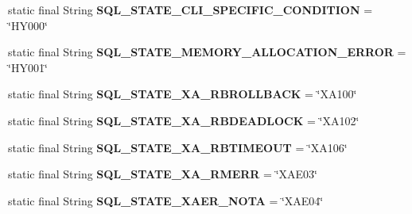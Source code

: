 \begin{DoxyCompactItemize}
static final String {\bfseries S\+Q\+L\+\_\+\+S\+T\+A\+T\+E\+\_\+\+C\+L\+I\+\_\+\+S\+P\+E\+C\+I\+F\+I\+C\+\_\+\+C\+O\+N\+D\+I\+T\+I\+ON} = \char`\"{}H\+Y000\char`\"{}
\item 
\mbox{\label{classcom_1_1mysql_1_1cj_1_1exceptions_1_1_mysql_error_numbers_a52bede019332d9e09454a9dc7efb2cf5}} 
static final String {\bfseries S\+Q\+L\+\_\+\+S\+T\+A\+T\+E\+\_\+\+M\+E\+M\+O\+R\+Y\+\_\+\+A\+L\+L\+O\+C\+A\+T\+I\+O\+N\+\_\+\+E\+R\+R\+OR} = \char`\"{}H\+Y001\char`\"{}
\item 
\mbox{\label{classcom_1_1mysql_1_1cj_1_1exceptions_1_1_mysql_error_numbers_a7d73cd99f43ef4739127fc2e99365050}} 
static final String {\bfseries S\+Q\+L\+\_\+\+S\+T\+A\+T\+E\+\_\+\+X\+A\+\_\+\+R\+B\+R\+O\+L\+L\+B\+A\+CK} = \char`\"{}X\+A100\char`\"{}
\item 
\mbox{\label{classcom_1_1mysql_1_1cj_1_1exceptions_1_1_mysql_error_numbers_a630346638b3d4374927cbeb24486b162}} 
static final String {\bfseries S\+Q\+L\+\_\+\+S\+T\+A\+T\+E\+\_\+\+X\+A\+\_\+\+R\+B\+D\+E\+A\+D\+L\+O\+CK} = \char`\"{}X\+A102\char`\"{}
\item 
\mbox{\label{classcom_1_1mysql_1_1cj_1_1exceptions_1_1_mysql_error_numbers_a2d32becd1fca43707034fa38cffae2e8}} 
static final String {\bfseries S\+Q\+L\+\_\+\+S\+T\+A\+T\+E\+\_\+\+X\+A\+\_\+\+R\+B\+T\+I\+M\+E\+O\+UT} = \char`\"{}X\+A106\char`\"{}
\item 
\mbox{\label{classcom_1_1mysql_1_1cj_1_1exceptions_1_1_mysql_error_numbers_a6c7f6d06804025ae523e5c744bbc089c}} 
static final String {\bfseries S\+Q\+L\+\_\+\+S\+T\+A\+T\+E\+\_\+\+X\+A\+\_\+\+R\+M\+E\+RR} = \char`\"{}X\+A\+E03\char`\"{}
\item 
\mbox{\label{classcom_1_1mysql_1_1cj_1_1exceptions_1_1_mysql_error_numbers_a8bf45faf3d9b57b2fe7dacdef94f1527}} 
static final String {\bfseries S\+Q\+L\+\_\+\+S\+T\+A\+T\+E\+\_\+\+X\+A\+E\+R\+\_\+\+N\+O\+TA} = \char`\"{}X\+A\+E04\char`\"{}

\end{DoxyCompactItemize}
